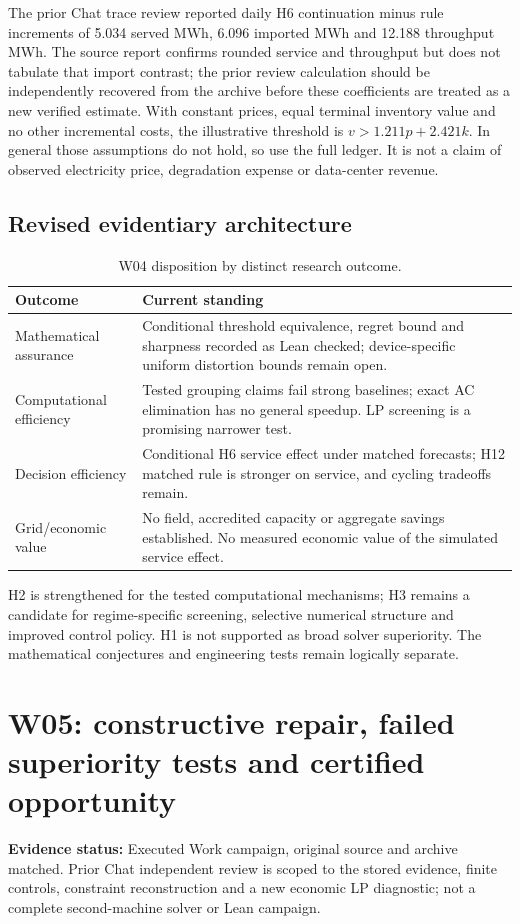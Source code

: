 \documentclass[11pt,letterpaper]{article}
\newcommand{\status}[1]{\textbf{Evidence status:} #1}
\begin{document}
The prior Chat trace review reported daily H6 continuation minus rule increments of 5.034 served MWh, 6.096 imported MWh and 12.188 throughput MWh. The source report confirms rounded service and throughput but does not tabulate that import contrast; the prior review calculation should be independently recovered from the archive before these coefficients are treated as a new verified estimate. With constant prices, equal terminal inventory value and no other incremental costs, the illustrative threshold is $v>1.211p+2.421k$. In general those assumptions do not hold, so use the full ledger. It is not a claim of observed electricity price, degradation expense or data-center revenue.

\subsection{Revised evidentiary architecture}
\begin{table}[htbp]\centering\small
\caption{W04 disposition by distinct research outcome.}
\begin{tabularx}{\linewidth}{P{.23\linewidth}Y}\toprule
Outcome & Current standing\\\midrule
Mathematical assurance & Conditional threshold equivalence, regret bound and sharpness recorded as Lean checked; device-specific uniform distortion bounds remain open.\\
Computational efficiency & Tested grouping claims fail strong baselines; exact AC elimination has no general speedup. LP screening is a promising narrower test.\\
Decision efficiency & Conditional H6 service effect under matched forecasts; H12 matched rule is stronger on service, and cycling tradeoffs remain.\\
Grid/economic value & No field, accredited capacity or aggregate savings established. No measured economic value of the simulated service effect.\\\bottomrule
\end{tabularx}
\end{table}
H2 is strengthened for the tested computational mechanisms; H3 remains a candidate for regime-specific screening, selective numerical structure and improved control policy. H1 is not supported as broad solver superiority. The mathematical conjectures and engineering tests remain logically separate.


\section{W05: constructive repair, failed superiority tests and certified opportunity}
\label{sec:w05results}
\status{Executed Work campaign, original source and archive matched. Prior Chat independent review is scoped to the stored evidence, finite controls, constraint reconstruction and a new economic LP diagnostic; not a complete second-machine solver or Lean campaign.}\cite{w05packet,w05review}
\end{document}
